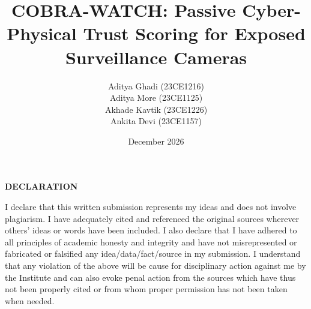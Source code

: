 \clearpage{}

\title{COBRA-WATCH: Passive Cyber-Physical Trust Scoring for Exposed Surveillance Cameras}

\author{Aditya Ghadi (23CE1216)\\Aditya More (23CE1125)\\Akhade Kavtik (23CE1226)\\Ankita Devi (23CE1157)}


\date{December 2026}

\project
{}


\maketitle

\certificate
\makeapproval

\begin{declaration}
\begin{center}
\Large \bf {DECLARATION}
\end{center}
\noindent
I declare that this written submission represents my ideas and does not involve plagiarism. I have adequately cited and referenced the original sources wherever others' ideas or words have been included. I also declare that I have adhered to all principles of academic honesty and integrity and have not misrepresented or fabricated or falsified any idea/data/fact/source in my submission. I understand that any violation of the above will be cause for disciplinary action against me by the Institute and can also evoke penal action from the sources which have thus not been properly cited or from whom proper permission has not been taken when needed.
\end{declaration}

